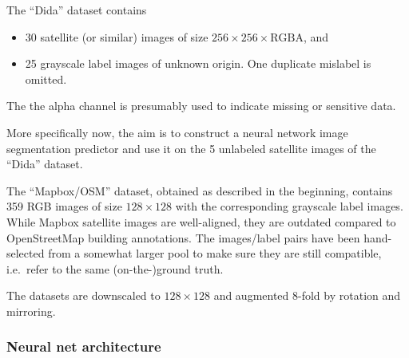 \documentclass[12pt,a4paper]{article}
\begin{document}
    The ``Dida'' dataset contains 
    \begin{itemize}
    \item 
        30 satellite (or similar) images of size $256 \times 256 \times \text{RGBA}$,
        and
    \item
        25 grayscale label images of unknown origin.
        One duplicate mislabel is omitted.
    \end{itemize}
    The the alpha channel is  
    presumably used to indicate missing or sensitive data.
    
    
    More specifically now, the aim is to construct a neural network 
    image segmentation predictor
    and
    use it on the 5 unlabeled satellite images
    of the ``Dida'' dataset.
    
    
    The ``Mapbox/OSM'' dataset, obtained as described in the beginning,
    contains 359 RGB images of size $128 \times 128$
    with the corresponding grayscale label images. 
    While Mapbox satellite images are well-aligned,
    they are outdated compared to OpenStreetMap building annotations.
    The images/label pairs have been hand-selected 
    from a somewhat larger pool
    to make sure they are still compatible,
    i.e.~refer to the same (on-the-)ground truth.
    
    
    The datasets are 
    downscaled to $128 \times 128$
    and
    augmented $8$-fold by 
    rotation and mirroring.

    
    \subsubsection*{Neural net architecture}
    
\end{document}

